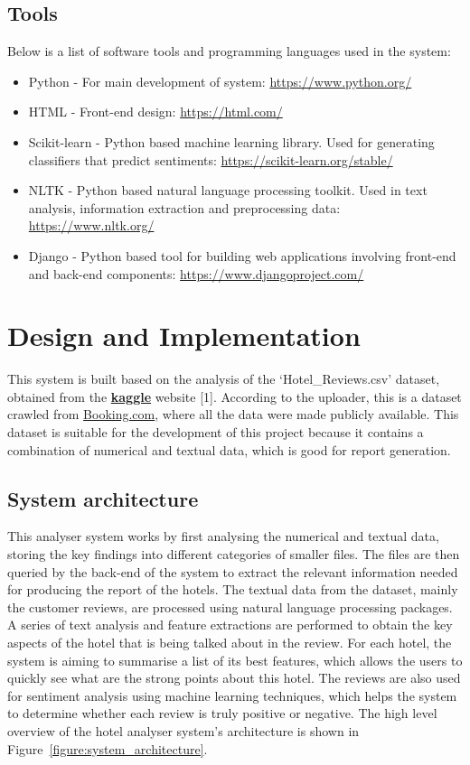 \documentclass[a4paper]{report}
\begin{document}
\section{Tools}
Below is a list of software tools and programming languages used in the system:
\begin{itemize}
    \item Python - For main development of system: \url{https://www.python.org/}
    \item HTML - Front-end design: \url{https://html.com/}
    \item Scikit-learn - Python based machine learning library. Used for generating classifiers that predict sentiments: \url{https://scikit-learn.org/stable/}
    \item NLTK - Python based natural language processing toolkit. Used in text analysis, information extraction and preprocessing data: \url{https://www.nltk.org/}
    \item Django - Python based tool for building web applications involving front-end and back-end components: \url{https://www.djangoproject.com/}
\end{itemize}



\chapter{Design and Implementation}
This system is built based on the analysis of the `Hotel\_Reviews.csv' dataset, obtained from the \href{https://www.kaggle.com/jiashenliu/515k-hotel-reviews-data-in-europe}{\textbf{kaggle}} website [1]. According to the uploader, this is a dataset crawled from \url{Booking.com}, where all the data were made publicly available. This dataset is suitable for the development of this project because it contains a combination of numerical and textual data,  which is good for report generation.



\section{System architecture}
This analyser system works by first analysing the numerical and textual data, storing the key findings into different categories of smaller files. The files are then queried by the back-end of the system to extract the relevant information needed for producing the report of the hotels. The textual data from the dataset, mainly the customer reviews, are processed using natural language processing packages. A series of text analysis and feature extractions are performed to obtain the key aspects of the hotel that is being talked about in the review. For each hotel, the system is aiming to summarise a list of its best features, which allows the users to quickly see what are the strong points about this hotel. The reviews are also used for sentiment analysis using machine learning techniques, which helps the system to determine whether each review is truly positive or negative. The high level overview of the hotel analyser system's architecture is shown in Figure~\ref{figure:system_architecture}.
\end{document}
